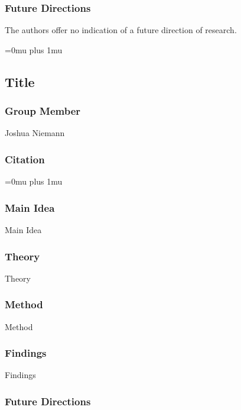 \subsubsection{Future Directions}

\noindent
The authors offer no indication of a future direction of research. 

\Urlmuskip=0mu plus 1mu\relax

\noindent
\subsection{Title}

\subsubsection{Group Member}

\noindent
Joshua Niemann

\noindent
\subsubsection{Citation}

\Urlmuskip=0mu plus 1mu\relax

\subsubsection{Main Idea}

\noindent
Main Idea

\subsubsection{Theory}

\noindent
Theory

\subsubsection{Method}

\noindent
Method

\subsubsection{Findings}

\noindent
Findings

\subsubsection{Future Directions}

